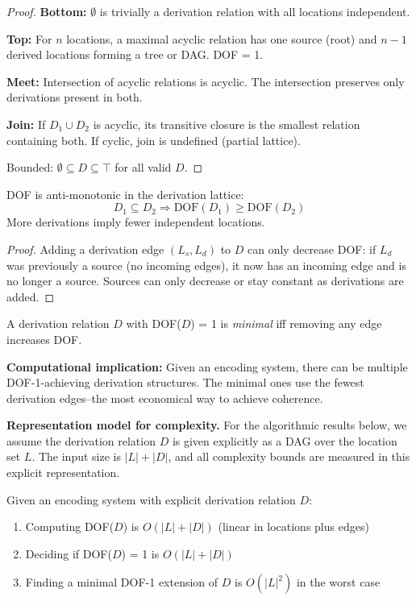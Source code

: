 \begin{proof}
\textbf{Bottom:} $\emptyset$ is trivially a derivation relation with all locations independent.

\textbf{Top:} For $n$ locations, a maximal acyclic relation has one source (root) and $n-1$ derived locations forming a tree or DAG. DOF = 1.

\textbf{Meet:} Intersection of acyclic relations is acyclic. The intersection preserves only derivations present in both.

\textbf{Join:} If $D_1 \cup D_2$ is acyclic, its transitive closure is the smallest relation containing both. If cyclic, join is undefined (partial lattice).

Bounded: $\emptyset \subseteq D \subseteq \top$ for all valid $D$.
\end{proof}

\begin{theorem}\label{thm:dof-antimonotone}
DOF is anti-monotonic in the derivation lattice:
\[
D_1 \subseteq D_2 \Rightarrow \text{DOF}(D_1) \geq \text{DOF}(D_2)
\]
More derivations imply fewer independent locations.
\end{theorem}

\begin{proof}
Adding a derivation edge $(L_s, L_d)$ to $D$ can only decrease DOF: if $L_d$ was previously a source (no incoming edges), it now has an incoming edge and is no longer a source. Sources can only decrease or stay constant as derivations are added.
\end{proof}

\begin{corollary}[Minimal DOF = 1 Derivations]\label{cor:minimal-dof1}
A derivation relation $D$ with DOF($D$) = 1 is \emph{minimal} iff removing any edge increases DOF.
\end{corollary}

\textbf{Computational implication:} Given an encoding system, there can be multiple DOF-1-achieving derivation structures. The minimal ones use the fewest derivation edges--the most economical way to achieve coherence.

\textbf{Representation model for complexity.} For the algorithmic results below, we assume the derivation relation $D$ is given explicitly as a DAG over the location set $L$. The input size is $|L| + |D|$, and all complexity bounds are measured in this explicit representation.

\begin{theorem}\label{thm:dof-complexity}
Given an encoding system with explicit derivation relation $D$:
\begin{enumerate}
\tightlist
\item Computing DOF($D$) is $O(|L| + |D|)$ (linear in locations plus edges)
\item Deciding if DOF($D$) = 1 is $O(|L| + |D|)$
\item Finding a minimal DOF-1 extension of $D$ is $O(|L|^2)$ in the worst case
\end{enumerate}
\end{theorem}

